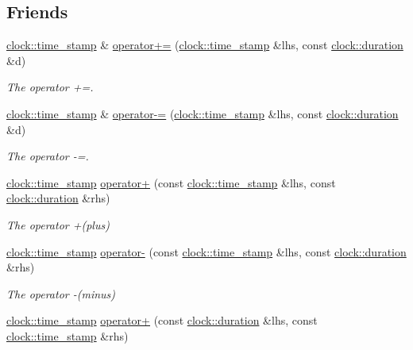 \subsection*{Friends}
\begin{DoxyCompactItemize}
\item 
\hyperlink{classclock_1_1time__stamp}{clock\+::time\+\_\+stamp} \& \hyperlink{classclock_1_1time__stamp_aac9d89cdae9b0970a13afe382dbae39e}{operator+=} (\hyperlink{classclock_1_1time__stamp}{clock\+::time\+\_\+stamp} \&lhs, const \hyperlink{classclock_1_1duration}{clock\+::duration} \&d)
\begin{DoxyCompactList}\small\item\em The operator +=. \end{DoxyCompactList}\item 
\hyperlink{classclock_1_1time__stamp}{clock\+::time\+\_\+stamp} \& \hyperlink{classclock_1_1time__stamp_a4f3f2c1b880983fded7b2be4479dd67e}{operator-\/=} (\hyperlink{classclock_1_1time__stamp}{clock\+::time\+\_\+stamp} \&lhs, const \hyperlink{classclock_1_1duration}{clock\+::duration} \&d)
\begin{DoxyCompactList}\small\item\em The operator -\/=. \end{DoxyCompactList}\item 
\hyperlink{classclock_1_1time__stamp}{clock\+::time\+\_\+stamp} \hyperlink{classclock_1_1time__stamp_a50a80fb73c7261d4422d85275c5e015b}{operator+} (const \hyperlink{classclock_1_1time__stamp}{clock\+::time\+\_\+stamp} \&lhs, const \hyperlink{classclock_1_1duration}{clock\+::duration} \&rhs)
\begin{DoxyCompactList}\small\item\em The operator +(plus) \end{DoxyCompactList}\item 
\hyperlink{classclock_1_1time__stamp}{clock\+::time\+\_\+stamp} \hyperlink{classclock_1_1time__stamp_a703172077ef665f20b5f100c26eb69be}{operator-\/} (const \hyperlink{classclock_1_1time__stamp}{clock\+::time\+\_\+stamp} \&lhs, const \hyperlink{classclock_1_1duration}{clock\+::duration} \&rhs)
\begin{DoxyCompactList}\small\item\em The operator -\/(minus) \end{DoxyCompactList}\item 
\hyperlink{classclock_1_1time__stamp}{clock\+::time\+\_\+stamp} \hyperlink{classclock_1_1time__stamp_a8dccfa10d4f3cd388c5fa488c1459897}{operator+} (const \hyperlink{classclock_1_1duration}{clock\+::duration} \&lhs, const \hyperlink{classclock_1_1time__stamp}{clock\+::time\+\_\+stamp} \&rhs)

\end{DoxyCompactItemize}
